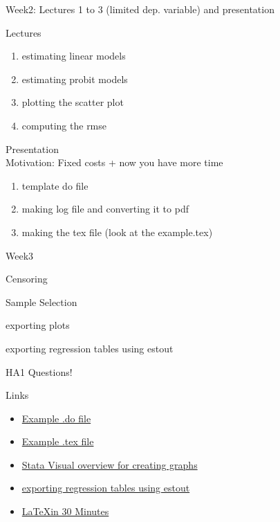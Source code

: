 \documentclass{beamer}
\begin{document}
\begin{frame}{Week2: Lectures 1 to 3 (limited dep. variable) and presentation}

Lectures
\begin{enumerate}[1.]
\item estimating linear models
\item estimating probit models
\item plotting the scatter plot
\item computing the rmse
\end{enumerate}

Presentation
\\
Motivation: Fixed costs + now you have more time
\\
\begin{enumerate}[1.]
\item template do file
\item making log file and converting it to pdf
\item making the tex file (look at the example.tex)
\end{enumerate}
    
\end{frame}


\begin{frame}{Week3}

Censoring 

Sample Selection

exporting plots

exporting regression tables using estout

HA1 Questions!

\end{frame}

\begin{frame}{Links}

\begin{itemize}

\item \href{https://github.com/mhdsh1/are256b-w24/blob/main/example.do}{Example .do file} 
\item \href{https://github.com/mhdsh1/are256b-w24/blob/main/example.tex}{Example .tex file}
\item \href{https://www.stata.com/support/faqs/graphics/gph/stata-graphs/}{Stata Visual overview for creating graphs}
\item \href{https://repec.sowi.unibe.ch/stata/estout/index.html}{exporting regression tables using estout}
\item \href{https://www.overleaf.com/learn/latex/Learn_LaTeX_in_30_minutes}{\LaTeX in 30 Minutes}

\end{itemize}

\end{frame}
\end{document}
